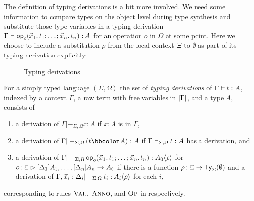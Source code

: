 The definition of typing derivations is a bit more involved.
We need some information to compare types on the object level during type synthesis and substitute those type variables in a typing derivation $\Gamma \vdash \tmOpts : A$ for an operation $o$ in $\Omega$ at some point.
Here we choose to include a substitution $\rho$ from the local context $\Xi$ to $\emptyset$ as part of its typing derivation explicitly:
\begin{definition}\label{def:typing-derivations}
  \begin{figure}
    \centering
    \small
    \caption{Typing derivations}
    \label{fig:extrinsic-typing}
  \end{figure}
  For a simply typed language $(\Sigma, \Omega)$ the set of \emph{typing derivations} of $\Gamma \vdash \isTerm{t} : A$, indexed by a context $\Gamma$, a raw term with free variables in $\left|\Gamma\right|$, and a type $A$, consists of 
  \begin{enumerate}
    \item a derivation of $\Gamma |-_{\Sigma, \Omega} x : A$ if $x : A$ is in $\Gamma$,
    \item a derivation of $\Gamma |-_{\Sigma, \Omega} (t \annotate A) : A$ if $\Gamma \vdash_{\Sigma, \Omega} \isTerm{t} : A$ has a derivation, and
    \item a derivation of $\Gamma |-_{\Sigma, \Omega} \tmOpts : \simsub{A_0}{\rho}$ for $o\colon \Xi \rhd [\Delta_{1}]A_{1}, \ldots, [\Delta_{n}]A_{n} \to A_0$ if there is a function $\rho\colon \Xi \to \mathsf{Ty}_{\Sigma}(\emptyset)$ and a derivation of $\Gamma, \vars{x}_{\isTerm{i}} : \Delta_i |-_{\Sigma, \Omega} \isTerm{t_i} : \simsub{A_i}{\rho}$ for each $i$,
  \end{enumerate}
  corresponding to rules $\textnormal{\textsc{Var}}$, $\textnormal{\textsc{Anno}}$, and $\textnormal{\textsc{Op}}$ in  respectively.
\end{definition}

